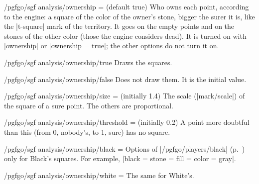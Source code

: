 \begin{key}{/pgfgo/sgf analysis/ownership =  (default true)}
	Who owns each point, according to the engine: a square of the color of the owner's stone, bigger the surer it is, like the |t-square| mark of the territory. It goes on the empty points and on the stones of the other color (those the engine considers dead). It is turned on with |ownership| or |ownership = true|; the other options do not turn it on.

	\begin{codeexample}[]
		\begin{goban}[9, scale = 0.6]
		\end{goban}
	\end{codeexample}
\end{key}

\begin{stylekey}{/pgfgo/sgf analysis/ownership/true}
	Draws the squares.
\end{stylekey}

\begin{stylekey}{/pgfgo/sgf analysis/ownership/false}
	Does not draw them. It is the initial value.
\end{stylekey}

\begin{key}{/pgfgo/sgf analysis/ownership/size =  (initially 1.4)}
	The scale (|mark/scale|) of the square of a sure point. The others are proportional.
\end{key}

\begin{key}{/pgfgo/sgf analysis/ownership/threshold =  (initially 0.2)}
	A point more doubtful than this (from 0, nobody's, to 1, sure) has no square.
\end{key}

\begin{key}{/pgfgo/sgf analysis/ownership/black = }
	Options of |/pgfgo/players/black| (p.~\pageref{subsec:jugadores}) only for Black's squares. For example, |black = {stone = {fill = {color = gray}}}|.
\end{key}

\begin{key}{/pgfgo/sgf analysis/ownership/white = }
	The same for White's.

	\begin{codeexample}[]
		\begin{goban}[9, scale = 0.6]
		\end{goban}
	\end{codeexample}
\end{key}

